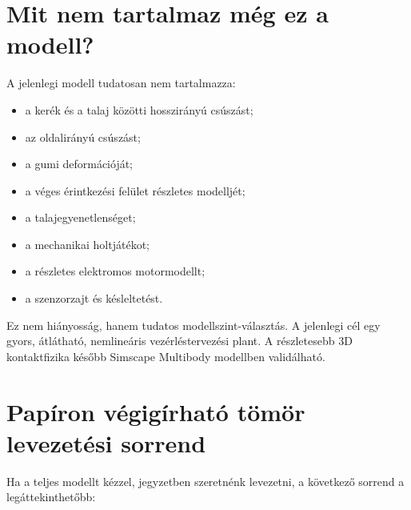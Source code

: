 \documentclass[12pt,a4paper]{article}
\begin{document}
	\section{Mit nem tartalmaz még ez a modell?}
	
	A jelenlegi modell tudatosan nem tartalmazza:
	\begin{itemize}[leftmargin=2em]
		\item a kerék és a talaj közötti hosszirányú csúszást;
		\item az oldalirányú csúszást;
		\item a gumi deformációját;
		\item a véges érintkezési felület részletes modelljét;
		\item a talajegyenetlenséget;
		\item a mechanikai holtjátékot;
		\item a részletes elektromos motormodellt;
		\item a szenzorzajt és késleltetést.
	\end{itemize}
	
	Ez nem hiányosság, hanem tudatos modellszint-választás. A jelenlegi cél egy gyors, átlátható, nemlineáris vezérléstervezési plant. A részletesebb 3D kontaktfizika később Simscape Multibody modellben validálható.
	
	\section{Papíron végigírható tömör levezetési sorrend}
	
	Ha a teljes modellt kézzel, jegyzetben szeretnénk levezetni, a következő sorrend a legáttekinthetőbb:
	
\end{document}
